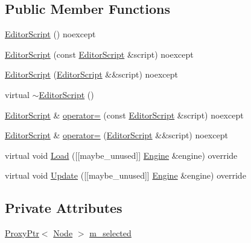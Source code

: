 \subsection*{Public Member Functions}
\begin{DoxyCompactItemize}
\item 
\mbox{\hyperlink{classmage_1_1script_1_1_editor_script_a6a16b52ab1952669a597abab1d66a73d}{Editor\+Script}} () noexcept
\item 
\mbox{\hyperlink{classmage_1_1script_1_1_editor_script_adfe05bb0529f098c404c25326ef0fd2e}{Editor\+Script}} (const \mbox{\hyperlink{classmage_1_1script_1_1_editor_script}{Editor\+Script}} \&script) noexcept
\item 
\mbox{\hyperlink{classmage_1_1script_1_1_editor_script_ac7db9f4ad73fc58c371aaf754009404e}{Editor\+Script}} (\mbox{\hyperlink{classmage_1_1script_1_1_editor_script}{Editor\+Script}} \&\&script) noexcept
\item 
virtual \mbox{\hyperlink{classmage_1_1script_1_1_editor_script_a1454bd68e4111691b6e287966dfd252a}{$\sim$\+Editor\+Script}} ()
\item 
\mbox{\hyperlink{classmage_1_1script_1_1_editor_script}{Editor\+Script}} \& \mbox{\hyperlink{classmage_1_1script_1_1_editor_script_ab7b4dda8389d07d41eba1474491b4a36}{operator=}} (const \mbox{\hyperlink{classmage_1_1script_1_1_editor_script}{Editor\+Script}} \&script) noexcept
\item 
\mbox{\hyperlink{classmage_1_1script_1_1_editor_script}{Editor\+Script}} \& \mbox{\hyperlink{classmage_1_1script_1_1_editor_script_a87df2b20fee97f6aa9e09b4b5c9282a5}{operator=}} (\mbox{\hyperlink{classmage_1_1script_1_1_editor_script}{Editor\+Script}} \&\&script) noexcept
\item 
virtual void \mbox{\hyperlink{classmage_1_1script_1_1_editor_script_af0804c603852f556d362f43e69240b2d}{Load}} (\mbox{[}\mbox{[}maybe\+\_\+unused\mbox{]}\mbox{]} \mbox{\hyperlink{classmage_1_1_engine}{Engine}} \&engine) override
\item 
virtual void \mbox{\hyperlink{classmage_1_1script_1_1_editor_script_a311532d499edfaf3f74aa598fb87ec8e}{Update}} (\mbox{[}\mbox{[}maybe\+\_\+unused\mbox{]}\mbox{]} \mbox{\hyperlink{classmage_1_1_engine}{Engine}} \&engine) override
\end{DoxyCompactItemize}
\subsection*{Private Attributes}
\begin{DoxyCompactItemize}
\item 
\mbox{\hyperlink{classmage_1_1_proxy_ptr}{Proxy\+Ptr}}$<$ \mbox{\hyperlink{classmage_1_1_node}{Node}} $>$ \mbox{\hyperlink{classmage_1_1script_1_1_editor_script_a60a8044379dfd203ad372dabb5c03380}{m\+\_\+selected}}
\end{DoxyCompactItemize}
